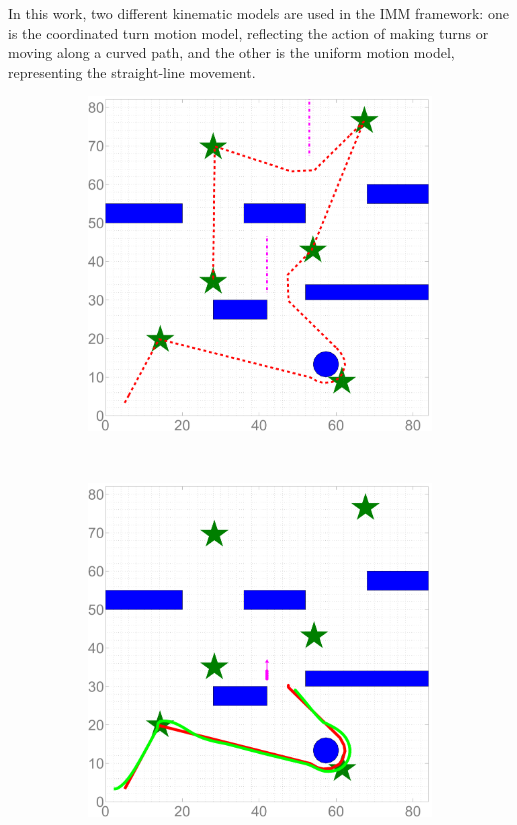 \documentclass[letterpaper, 10 pt, conference]{ieeeconf}
\begin{document}
	In this work, two different kinematic models are used in the IMM framework: one is the coordinated turn motion model, reflecting the action of making turns or moving along a curved path, and the other is the uniform motion model, representing the straight-line movement. 
	\begin{figure}
		\centering
		\begin{subfigure}{0.2\textwidth}
			\includegraphics[width=\textwidth]{figures/ref_traj_end}
			\caption{}
			\label{fig:ref_traj_h}
		\end{subfigure}
		~
		\begin{subfigure}{0.2\textwidth}
			\includegraphics[width=\textwidth]{figures/sim_traj_obs1}

\end{subfigure}
\end{figure}
\end{document}
